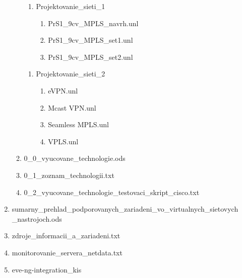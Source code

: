 \begin{enumerate}[noitemsep,label*=\thesection.\arabic*.]
\begin{enumerate}[noitemsep,label*=\arabic*.]
        \begin{enumerate}[noitemsep,label*=\arabic*.]
            \item Projektovanie\_sieti\_1
            
            \begin{enumerate}[noitemsep,label*=\arabic*.]
                \item PrS1\_9cv\_MPLS\_navrh.unl
                \item PrS1\_9cv\_MPLS\_set1.unl
                \item PrS1\_9cv\_MPLS\_set2.unl
            \end{enumerate}
        \end{enumerate}
        
        \begin{enumerate}[noitemsep,label*=\arabic*.]
            \item Projektovanie\_sieti\_2
            
            \begin{enumerate}[noitemsep,label*=\arabic*.]
                \item eVPN.unl
                \item Mcast VPN.unl
                \item Seamless MPLS.unl
                \item VPLS.unl
            \end{enumerate}
        \end{enumerate}
        
        \item \label{item:zoznam_technologii_s_podporou_zariadeni} 0\_0\_vyucovane\_technologie.ods
        \item \label{item:zoznam_technologii_txt} 0\_1\_zoznam\_technologii.txt
        \item \label{item:cisco_feature_testing_skript} 0\_2\_vyucovane\_technologie\_testovaci\_skript\_cisco.txt
    \end{enumerate}
    
    \item \label{item:sumarny_prehlad_zariadeni} sumarny\_prehlad\_podporovanych\_zariadeni\_vo\_virtualnych\_sietovych\\\_nastrojoch.ods
    \item \label{item:zdroje_informacii_a_zariadeni} zdroje\_informacii\_a\_zariadeni.txt
    \item \label{item:monitorovanie} monitorovanie\_servera\_netdata.txt
    \item \label{item:upraveny_integracny_balicek_linux} eve-ng-integration\_kis
\end{enumerate}





